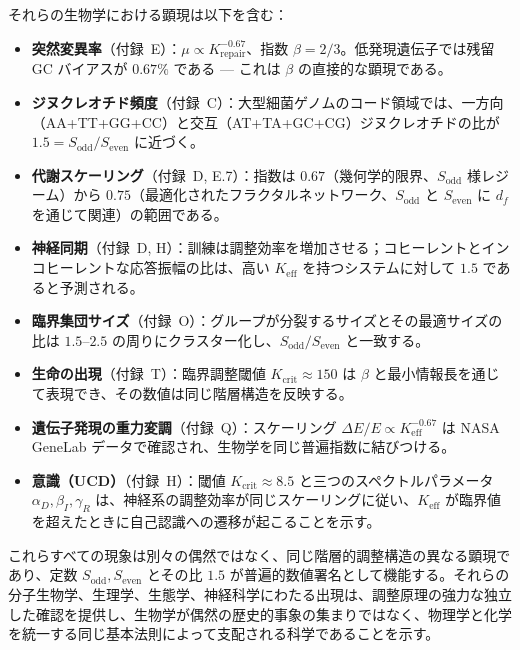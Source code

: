 \documentclass[12pt,a4paper]{article}
\theoremstyle{remark}
\begin{document}
	それらの生物学における顕現は以下を含む：
	
	\begin{itemize}
		\item \textbf{突然変異率}（付録~E）：\(\mu \propto K_{\mathrm{repair}}^{-0.67}\)、指数 \(\beta = 2/3\)。低発現遺伝子では残留 GC バイアスが \(0.67\%\) である — これは \(\beta\) の直接的な顕現である。
		\item \textbf{ジヌクレオチド頻度}（付録~C）：大型細菌ゲノムのコード領域では、一方向（AA+TT+GG+CC）と交互（AT+TA+GC+CG）ジヌクレオチドの比が \(1.5 = S_{\mathrm{odd}}/S_{\mathrm{even}}\) に近づく。
		\item \textbf{代謝スケーリング}（付録~D, E.7）：指数は \(0.67\)（幾何学的限界、\(S_{\mathrm{odd}}\) 様レジーム）から \(0.75\)（最適化されたフラクタルネットワーク、\(S_{\mathrm{odd}}\) と \(S_{\mathrm{even}}\) に \(d_f\) を通じて関連）の範囲である。
		\item \textbf{神経同期}（付録~D, H）：訓練は調整効率を増加させる；コヒーレントとインコヒーレントな応答振幅の比は、高い \(K_{\mathrm{eff}}\) を持つシステムに対して \(1.5\) であると予測される。
		\item \textbf{臨界集団サイズ}（付録~O）：グループが分裂するサイズとその最適サイズの比は \(1.5\)--\(2.5\) の周りにクラスター化し、\(S_{\mathrm{odd}}/S_{\mathrm{even}}\) と一致する。
		\item \textbf{生命の出現}（付録~T）：臨界調整閾値 \(K_{\mathrm{crit}} \approx 150\) は \(\beta\) と最小情報長を通じて表現でき、その数値は同じ階層構造を反映する。
		\item \textbf{遺伝子発現の重力変調}（付録~Q）：スケーリング \(\Delta E/E \propto K_{\mathrm{eff}}^{-0.67}\) は NASA GeneLab データで確認され、生物学を同じ普遍指数に結びつける。
		\item \textbf{意識（UCD）}（付録~H）：閾値 \(K_{\mathrm{crit}} \approx 8.5\) と三つのスペクトルパラメータ \(\alpha_D,\beta_I,\gamma_R\) は、神経系の調整効率が同じスケーリングに従い、\(K_{\mathrm{eff}}\) が臨界値を超えたときに自己認識への遷移が起こることを示す。
	\end{itemize}
	
	これらすべての現象は別々の偶然ではなく、同じ階層的調整構造の異なる顕現であり、定数 \(S_{\mathrm{odd}}, S_{\mathrm{even}}\) とその比 \(1.5\) が普遍的数値署名として機能する。それらの分子生物学、生理学、生態学、神経科学にわたる出現は、調整原理の強力な独立した確認を提供し、生物学が偶然の歴史的事象の集まりではなく、物理学と化学を統一する同じ基本法則によって支配される科学であることを示す。
	
\end{document}
